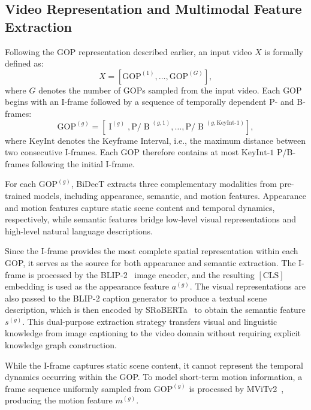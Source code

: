 \subsection{Video Representation and Multimodal Feature Extraction}
\label{subsec:subsec_42_extraction}
Following the GOP representation described earlier, an input video $X$ is formally defined as:
\begin{equation}
X=\left[{\mathrm{GOP}}^{\left(1\right)},\ldots,{\mathrm{GOP}}^{\left(G\right)}\right],
\end{equation}
where $G$ denotes the number of GOPs sampled from the input video. Each GOP begins with an I-frame followed by a sequence of temporally dependent P- and B-frames:
\begin{equation}
{\mathrm{GOP}}^{\left(g\right)}=\left[\mathrm{\operatorname{I}}^{\left(g\right)},{\mathrm{P/\operatorname{B}}}^{\left(g,1\right)},\ldots,{\mathrm{P/\operatorname{B}}}^{\left(g,\mathrm{KeyInt}\texttt{-}1\right)}\right],
\end{equation}
where $\mathrm{KeyInt}$ denotes the Keyframe Interval, i.e., the maximum distance between two consecutive I-frames. Each GOP therefore contains at most $\mathrm{KeyInt}\texttt{-}1$ P/B-frames following the initial I-frame.

For each ${\mathrm{GOP}}^{\left(g\right)}$, BiDecT extracts three complementary modalities from pre-trained models, including appearance, semantic, and motion features. Appearance and motion features capture static scene content and temporal dynamics, respectively, while semantic features bridge low-level visual representations and high-level natural language descriptions.

Since the I-frame provides the most complete spatial representation within each GOP, it serves as the source for both appearance and semantic extraction. The I-frame is processed by the BLIP-2~\cite{liBLIP2BootstrappingLanguageImage2023} image encoder, and the resulting $\mathrm{[CLS]}$ embedding is used as the appearance feature $a^{\left(g\right)}$. The visual representations are also passed to the BLIP-2 caption generator to produce a textual scene description, which is then encoded by SRoBERTa~\cite{reimersSentenceBERTSentenceEmbeddings2019} to obtain the semantic feature $s^{\left(g\right)}$. This dual-purpose extraction strategy transfers visual and linguistic knowledge from image captioning to the video domain without requiring explicit knowledge graph construction.

While the I-frame captures static scene content, it cannot represent the temporal dynamics occurring within the GOP. To model short-term motion information, a frame sequence uniformly sampled from ${\mathrm{GOP}}^{\left(g\right)}$ is processed by MViTv2~\cite{liMViTv2ImprovedMultiscale2022}, producing the motion feature $m^{\left(g\right)}$.

